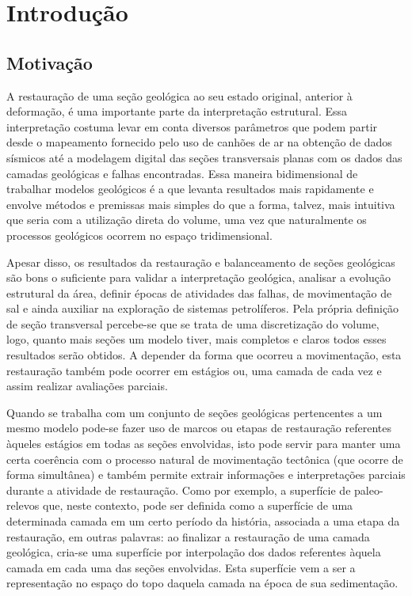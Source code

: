 
\chapter{Introdução}

\section{Motivação}

A restauração de uma seção geológica ao seu estado original, anterior à deformação, é uma importante parte da interpretação estrutural.\cite{Fossen} Essa interpretação costuma levar em conta diversos parâmetros que podem partir desde o mapeamento fornecido pelo uso de canhões de ar na obtenção de dados sísmicos até a modelagem digital das seções transversais planas com os dados das camadas geológicas e falhas encontradas.
Essa maneira bidimensional de trabalhar modelos geológicos é a que levanta resultados mais rapidamente e envolve métodos e premissas mais simples do que a forma, talvez, mais intuitiva que seria com a utilização direta do volume, uma vez que naturalmente os processos geológicos ocorrem no espaço tridimensional.

Apesar disso, os resultados da restauração e balanceamento de seções geológicas são bons o suficiente para validar a interpretação geológica, analisar a evolução estrutural da área, definir épocas de atividades das falhas, de movimentação de sal e ainda auxiliar na exploração de sistemas petrolíferos.\cite{Guedes} Pela própria definição de seção transversal percebe-se que se trata de uma discretização do volume, logo, quanto mais seções um modelo tiver, mais completos e claros todos esses resultados serão obtidos. A depender da forma que ocorreu a movimentação, esta restauração também pode ocorrer em estágios ou, uma camada de cada vez e assim realizar avaliações parciais.

Quando se trabalha com um conjunto de seções geológicas pertencentes a um mesmo modelo pode-se fazer uso de marcos ou etapas de restauração referentes àqueles estágios em todas as seções envolvidas, isto pode servir para manter uma certa coerência com o processo natural de movimentação tectônica (que ocorre de forma simultânea) e também permite extrair informações e interpretações parciais durante a atividade de restauração. Como por exemplo, a superfície de paleo-relevos que, neste contexto, pode ser definida como a superfície de uma determinada camada em um certo período da história, associada a uma etapa da restauração, em outras palavras: ao finalizar a restauração de uma camada geológica, cria-se uma superfície por interpolação dos dados referentes àquela camada em cada uma das seções envolvidas. Esta superfície vem a ser a representação no espaço do topo daquela camada na época de sua sedimentação.

